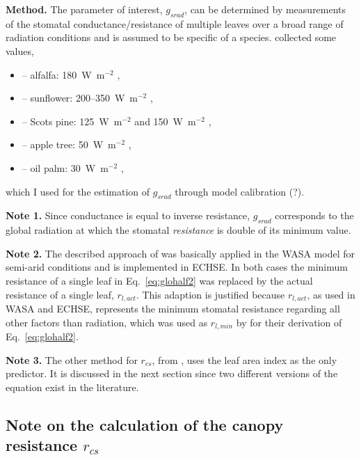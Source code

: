 \documentclass{scrreprt}
\newenvironment{denseitem}{
  \begin{itemize}
    \setlength{\itemsep}{0pt}
    \setlength{\parskip}{0pt}
    \setlength{\parsep}{0pt}
}{
  \end{itemize}
}
\begin{document}
\textbf{Method.}
The parameter of interest, $g_{srad}$, can be determined by measurements of the stomatal conductance/resistance of multiple leaves over a broad range of radiation conditions and is assumed to be specific of a species.
\citet{saugier91} collected some values,
\begin{denseitem}
  \item[--] alfalfa: 180~W~m$^{-2}$ \citep{katerji83},
  \item[--] sunflower: 200--350~W~m$^{-2}$ \citep{berger73},
  \item[--] Scots pine: 125~W~m$^{-2}$ \citep{lohammar80} and 150~W~m$^{-2}$ \citep{jarvis81},
  \item[--] apple tree: 50~W~m$^{-2}$ \citep{warrit80},
  \item[--] oil palm: 30~W~m$^{-2}$ \citep{dufrene89},
\end{denseitem}
%
which I used for the estimation of $g_{srad}$ through model calibration (?).

\textbf{Note 1.}
Since conductance is equal to inverse resistance, $g_{srad}$ corresponds to the global radiation at which the stomatal \emph{resistance} is double of its minimum value.

\textbf{Note 2.}
The described approach of \citet{saugier91} was basically applied in the WASA model for semi-arid conditions \citep{guentner02} and is implemented in ECHSE.
In both cases the minimum resistance of a single leaf in Eq.~\eqref{eq:glohalf2} was replaced by the actual resistance of a single leaf, $r_{l,act}$.
This adaption is justified because $r_{l,act}$, as used in WASA and ECHSE, represents the minimum stomatal resistance regarding all other factors than radiation, which was used as $r_{l,min}$ by \citet{saugier91} for their derivation of Eq.~\eqref{eq:glohalf2}.

\textbf{Note 3.}
The other method for $r_{cs}$, from \citet{shuttleworth85}, uses the leaf area index as the only predictor.
It is discussed in the next section since two different versions of the equation exist in the literature.

\subsection{Note on the calculation of the canopy resistance $r_{cs}$} \label{ssec:parest_veg_notercs}
\end{document}
